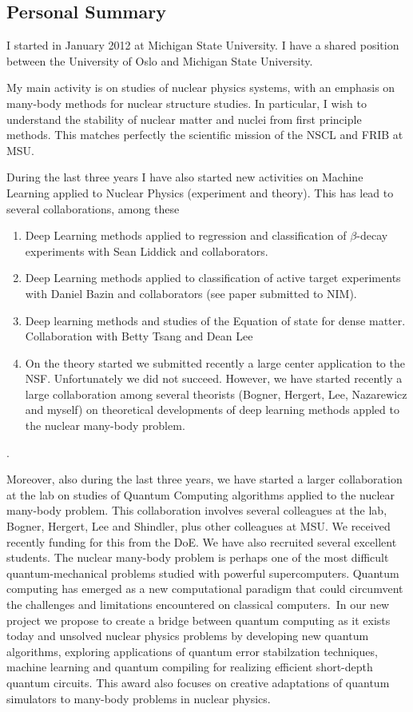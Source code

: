 \documentclass[prc,amsart,english,superscriptaddress,showpacs,floatfix]{revtex4}
\begin{document}
\subsection*{Personal Summary}

I started in January 2012 at Michigan State University. I have a
shared position between the University of Oslo and Michigan State
University.

My main activity is on studies of nuclear physics systems, with an
emphasis on many-body methods for nuclear structure studies. In
particular, I wish to understand the stability of nuclear matter and
nuclei from first principle methods. This matches perfectly the
scientific mission of the NSCL and FRIB at MSU.

During the last three years I have also started new activities on Machine Learning applied to Nuclear Physics (experiment and theory). This has lead to several collaborations, among these
\begin{enumerate}
\item Deep Learning methods applied to regression and classification of $\beta$-decay experiments with Sean Liddick and collaborators.
\item Deep Learning methods applied to classification of active target experiments with Daniel Bazin and collaborators (see paper submitted to NIM).
\item Deep learning methods and studies of the Equation of state for dense matter. Collaboration with Betty Tsang and Dean Lee
\item On the theory started we submitted recently a large center application to the NSF. Unfortunately we did not succeed. However, we have started recently a large collaboration among several theorists (Bogner, Hergert, Lee, Nazarewicz and myself) on theoretical developments of deep learning methods appled to the nuclear many-body problem.
\end{enumerate}.

Moreover, also during the last three years, we have started a larger
collaboration at the lab on studies of Quantum Computing algorithms
applied to the nuclear many-body problem. This collaboration involves
several colleagues at the lab, Bogner, Hergert, Lee and Shindler, plus
other colleagues at MSU. We received recently funding for this from
the DoE. We have also recruited several excellent students. The
nuclear many-body problem is perhaps one of the most difficult
quantum-mechanical problems studied with powerful
supercomputers. Quantum computing has emerged as a new computational
paradigm that could circumvent the challenges and limitations
encountered on classical computers. In our new project we  propose to create a bridge
between quantum computing as it exists today and unsolved nuclear
physics problems by developing new quantum algorithms, exploring
applications of quantum error stabilzation techniques, machine
learning and quantum compiling for realizing efficient short-depth
quantum circuits. This award also focuses on creative adaptations of
quantum simulators to many-body problems in nuclear physics. 
\end{document}
